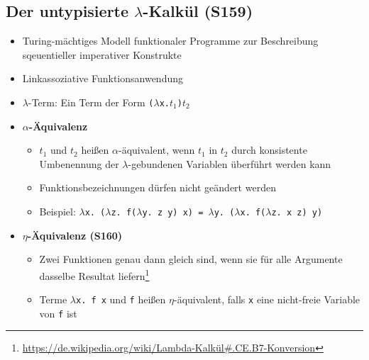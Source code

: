 \subsection{Der untypisierte $\lambda$-Kalkül (S159)}
\begin{itemize}
	\item Turing-mächtiges Modell funktionaler Programme zur Beschreibung sqeuentieller imperativer Konstrukte
	\item Linkassoziative Funktionsanwendung
	\item \(\lambda\)-Term: Ein Term der Form \texttt{(\(\lambda\)x.\(t_1\))\(t_2\)}
	\item \textbf{\(\alpha\)-Äquivalenz}
	\begin{itemize}
		\item \(t_1\) und \(t_2\) heißen \(\alpha\)-äquivalent, wenn \(t_1\) in \(t_2\) durch konsistente Umbenennung der \(\lambda\)-gebundenen Variablen überführt werden kann
		\item Funktionsbezeichnungen dürfen nicht geändert werden
		\item Beispiel: \texttt{\(\lambda\)x. (\(\lambda\)z. f(\(\lambda\)y. z y) x) = \(\lambda\)y. (\(\lambda\)x. f(\(\lambda\)z. x z) y)}
	\end{itemize}
	\item \textbf{\(\eta\)-Äquivalenz (S160)}
	\begin{itemize}
		\item Zwei Funktionen genau dann gleich sind, wenn sie für alle Argumente dasselbe Resultat liefern\footnote{\url{https://de.wikipedia.org/wiki/Lambda-Kalkül\#.CE.B7-Konversion}}
		\item Terme \texttt{\(\lambda\)x. f x} und \texttt{f} heißen \(\eta\)-äquivalent, falls \texttt{x} eine nicht-freie Variable von \texttt{f} ist
	\end{itemize}
\end{itemize}

